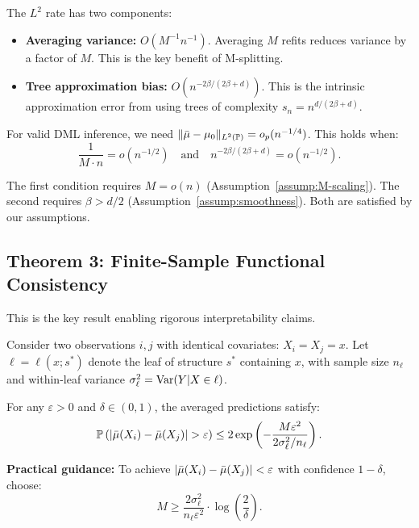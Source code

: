 \documentclass[12pt]{article}
\begin{document}
\begin{remark}
The $L^2$ rate has two components:
\begin{itemize}
\item \textbf{Averaging variance:} $O(M^{-1}n^{-1})$. Averaging $M$ refits reduces variance by a factor of $M$. This is the key benefit of M-splitting.
\item \textbf{Tree approximation bias:} $O(n^{-2\beta/(2\beta+d)})$. This is the intrinsic approximation error from using trees of complexity $s_n = n^{d/(2\beta+d)}$.
\end{itemize}

For valid DML inference, we need $\|\bar{\mu} - \mu_0\|_{L^2(\mathbb{P})} = o_p(n^{-1/4})$. This holds when:
\begin{equation}\label{eq:rate-condition}
\frac{1}{M \cdot n} = o(n^{-1/2}) \quad \text{and} \quad n^{-2\beta/(2\beta+d)} = o(n^{-1/2}).
\end{equation}

The first condition requires $M = o(n)$ (Assumption~\ref{assump:M-scaling}). The second requires $\beta > d/2$ (Assumption~\ref{assump:smoothness}). Both are satisfied by our assumptions.
\end{remark}

\subsection{Theorem 3: Finite-Sample Functional Consistency}

This is the key result enabling rigorous interpretability claims.

\begin{theorem}
\label{thm:functional-consistency}
Consider two observations $i, j$ with identical covariates: $X_i = X_j = x$. Let $\ell = \ell(x; s^*)$ denote the leaf of structure $s^*$ containing $x$, with sample size $n_\ell$ and within-leaf variance $\sigma^2_\ell = \operatorname{Var}(Y | X \in \ell)$.

For any $\varepsilon > 0$ and $\delta \in (0, 1)$, the averaged predictions satisfy:
\[
\mathbb{P}\left(|\bar{\mu}(X_i) - \bar{\mu}(X_j)| > \varepsilon\right) \le 2 \exp\left(-\frac{M \varepsilon^2}{2 \sigma^2_\ell / n_\ell}\right).
\]

\textbf{Practical guidance:} To achieve $|\bar{\mu}(X_i) - \bar{\mu}(X_j)| < \varepsilon$ with confidence $1 - \delta$, choose:
\begin{equation}\label{eq:M-choice}
M \ge \frac{2\sigma^2_\ell}{n_\ell \varepsilon^2} \cdot \log\left(\frac{2}{\delta}\right).
\end{equation}
\end{theorem}
\end{document}
